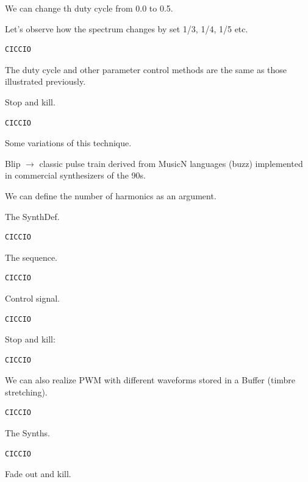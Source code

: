 We can change th duty cycle from 0.0 to 0.5.

Let's observe how the spectrum changes by set 1/3, 1/4, 1/5 etc.

\begin{lstlisting}[frame=single] 
CICCIO
\end{lstlisting}

The duty cycle and other parameter control methods are the same as those illustrated previously.

Stop and kill.

\begin{lstlisting}[frame=single] 
CICCIO
\end{lstlisting}

Some variations of this technique.

Blip \(\rightarrow\) classic pulse train derived from MusicN languages
(buzz) implemented in commercial synthesizers of the 90s.

We can define the number of harmonics as an argument.

The SynthDef.

\begin{lstlisting}[frame=single] 
CICCIO
\end{lstlisting}

The sequence.

\begin{lstlisting}[frame=single] 
CICCIO
\end{lstlisting}

Control signal.

\begin{lstlisting}[frame=single] 
CICCIO
\end{lstlisting}

Stop and kill:

\begin{lstlisting}[frame=single] 
CICCIO
\end{lstlisting}

We can also realize PWM with different waveforms stored in a Buffer (timbre stretching).

\begin{lstlisting}[frame=single] 
CICCIO
\end{lstlisting}

The Synths.

\begin{lstlisting}[frame=single] 
CICCIO
\end{lstlisting}

Fade out and kill.

